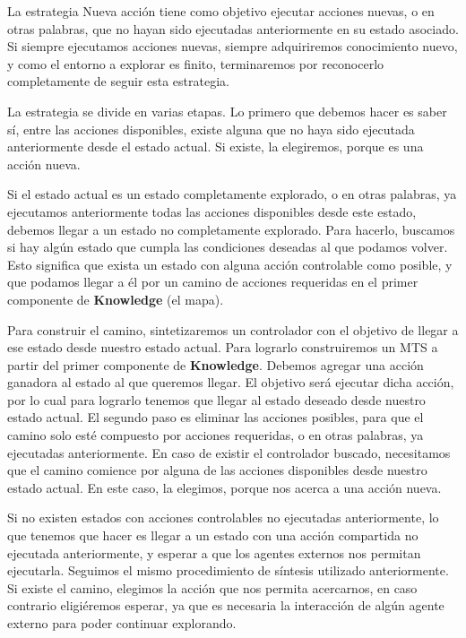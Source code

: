 La estrategia Nueva acción tiene como objetivo ejecutar acciones nuevas, o en otras palabras, que no hayan sido ejecutadas anteriormente en su estado asociado. 
Si siempre ejecutamos acciones nuevas, siempre adquiriremos conocimiento nuevo, y como el entorno a explorar es finito, terminaremos por reconocerlo completamente 
de seguir esta estrategia.


La estrategia se divide en varias etapas. Lo primero que debemos hacer es saber sí, entre las acciones disponibles, existe alguna que no haya sido ejecutada 
anteriormente desde el estado actual. Si existe, la elegiremos, porque es una acción nueva.


Si el estado actual es un estado completamente explorado, o en otras palabras, ya ejecutamos anteriormente todas las acciones disponibles desde este estado, debemos 
llegar a un estado no completamente explorado. Para hacerlo, buscamos si hay algún estado que cumpla las condiciones deseadas al que podamos volver. Esto 
significa que exista un estado con alguna acción controlable como posible, y que podamos llegar a él por un camino de acciones requeridas en el primer componente 
de \textbf{Knowledge} (el mapa).


Para construir el camino, sintetizaremos un controlador con el objetivo de llegar a ese estado desde nuestro estado actual. Para lograrlo construiremos un MTS 
a partir del primer componente de \textbf{Knowledge}. Debemos agregar una acción ganadora al estado al que queremos llegar. El objetivo será ejecutar dicha acción, 
por lo cual para lograrlo tenemos que llegar al estado deseado desde nuestro estado actual. El segundo paso es eliminar las acciones posibles, para que el camino 
solo esté compuesto por acciones requeridas, o en otras palabras, ya ejecutadas anteriormente. En caso de existir el controlador buscado, necesitamos que el camino 
comience por alguna de las acciones disponibles desde nuestro estado actual. En este caso, la elegimos, porque nos acerca a una acción nueva.


Si no existen estados con acciones controlables no ejecutadas anteriormente, lo que tenemos que hacer es llegar a un estado con una acción compartida no ejecutada 
anteriormente, y esperar a que los agentes externos nos permitan ejecutarla. Seguimos el mismo procedimiento de síntesis utilizado anteriormente. Si existe el camino, 
elegimos la acción que nos permita acercarnos, en caso contrario eligiéremos esperar, ya que es necesaria la interacción de algún agente externo para poder continuar 
explorando.


